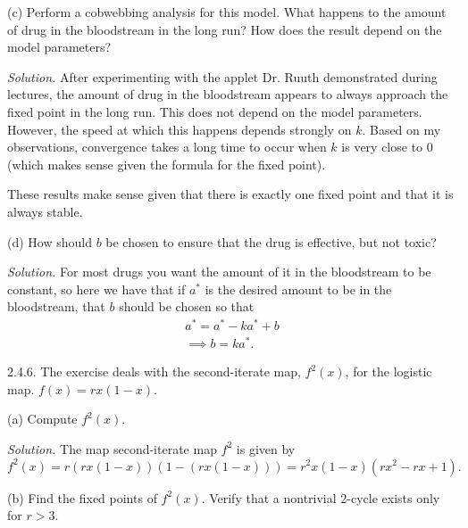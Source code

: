 \documentclass{article}
\newcommand{\as}{a^*}
\begin{document}
(c) Perform a cobwebbing analysis for this model. What happens to the
amount of drug in the bloodstream in the long run? How does the result
depend on the model parameters?

\textit{Solution.}
After experimenting with the applet Dr. Ruuth demonstrated during
lectures, the amount of drug in the bloodstream appears to always
approach the fixed point in the long run. This does not depend on the
model parameters. However, the speed at which this happens depends strongly
on $k$. Based on my observations, convergence takes a long time to occur
when $k$ is very close to $0$ (which makes sense given the formula for
the fixed point).

These results make sense given that there is exactly one fixed point and
that it is always stable.

\vspace{5mm}

(d) How should $b$ be chosen to ensure that the drug is effective, but
not toxic?

\textit{Solution.}
For most drugs you want the amount of it in the bloodstream to be
constant, so here we have that if $\as$ is the desired amount to be in
the bloodstream, that $b$ should be chosen so that
%
\begin{align*}
    \as = \as - k \as + b \\
    \implies b = k \as
    .
\end{align*}

\newpage

2.4.6. The exercise deals with the second-iterate map, $f^2(x)$, for the
  logistic map. $f(x) = r x (1 - x)$.

(a) Compute $f^2(x)$.

\textit{Solution.} The map second-iterate map $f^2$ is given by
%
\begin{equation*}
    f^2(x) = r (rx(1 - x)) (1 - (rx(1 - x))) = r^2 x (1 - x) (r x^2 - r x + 1)
    .
\end{equation*}

\vspace{5mm}

(b) Find the fixed points of $f^2(x)$. Verify that a nontrivial
$2$-cycle exists only for $r > 3$.
\end{document}
